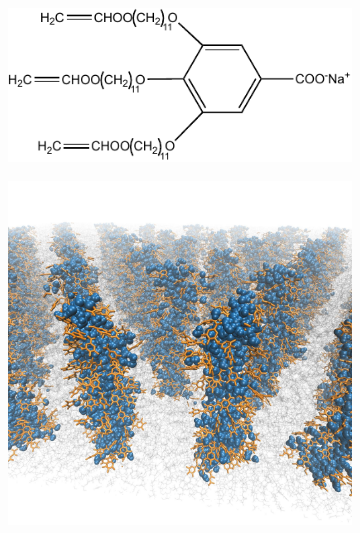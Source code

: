 \documentclass[journal=jpcbfk,manuscript=article]{achemso}
\begin{document}
  \begin{figure}
  \centering
  \begin{subfigure}{0.325\textwidth}
  \vspace{1.4cm}
  \includegraphics[width=\textwidth]{NaGA3C11.pdf}
  \vspace{1cm}
  \caption{}
  \end{subfigure}
  \begin{subfigure}{0.325\textwidth}
  \includegraphics[width=\textwidth]{ortho_view.pdf}
  \caption{}
  \end{subfigure}
  \begin{subfigure}{0.325\textwidth}

\end{subfigure}
\end{figure}
\end{document}
